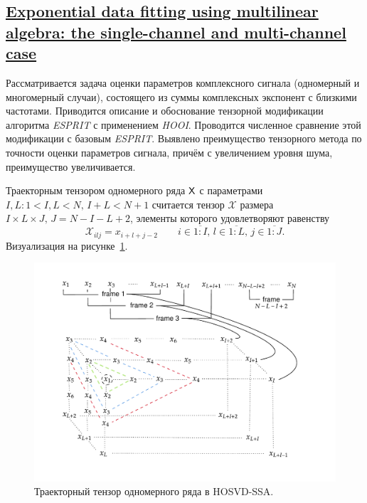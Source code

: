 \documentclass[12pt]{article}
\theoremstyle{plain}
\theoremstyle{definition}
\theoremstyle{remark}
\newcommand{\HOOI}{\emph{HOOI}}
\newcommand{\ESPRIT}{\emph{ESPRIT}}
\begin{document}
\subsection{\href{https://doi.org/10.1002/nla.453}{Exponential data
    fitting using multilinear algebra: the single-channel and
multi-channel case}}\label{Papy2005}
Рассматривается задача оценки параметров комплексного сигнала
(одномерный и многомерный случаи), состоящего из
суммы комплексных экспонент с близкими частотами.
Приводится описание и обоснование тензорной модификации алгоритма
\ESPRIT{} с применением \HOOI{}.
Проводится численное сравнение этой модификации с базовым \ESPRIT{}.
Выявлено преимущество тензорного метода по точности оценки параметров
сигнала, причём с увеличением уровня шума, преимущество увеличивается.

Траекторным тензором одномерного ряда $\mathsf{X}$ с параметрами $I,L: 1 < I,L < N,\,
I + L < N + 1$ считается тензор $\mathcal{X}$ размера $I\times L \times J,\,
J=N-I-L+2$, элементы которого удовлетворяют равенству
\[
  \mathcal{X}_{ilj}=x_{i+l+j-2}\qquad i\in \overline{1:I},\, l
  \in\overline{1:L},\, j \in\overline{1:J}.
\]
Визуализация на рисунке~\ref{fig:traj-hosvd-ssa}.
\begin{figure}[!ht]
  \centering
  \includegraphics[width=\textwidth]{tens-injection-wide.pdf}
  \caption{Траекторный тензор одномерного ряда в
  HOSVD-SSA.}\label{fig:traj-hosvd-ssa}
\end{figure}
\end{document}
